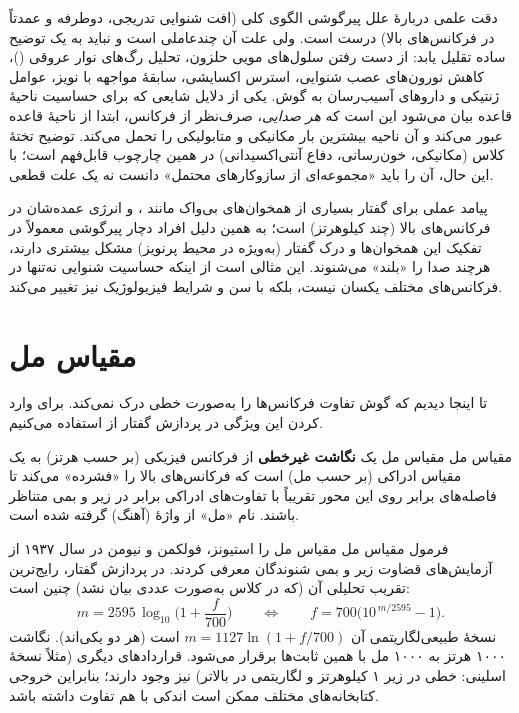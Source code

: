 \begin{correctionbox}{دقت علمی دربارهٔ علل پیرگوشی}
الگوی کلی (افت شنوایی تدریجی، دوطرفه و عمدتاً در فرکانس‌های بالا) درست است. ولی علت آن چندعاملی است و نباید به یک توضیح ساده تقلیل یابد: از دست رفتن سلول‌های مویی حلزون، تحلیل رگ‌های نوار عروقی ()، کاهش نورون‌های عصب شنوایی، استرس اکسایشی، سابقهٔ مواجهه با نویز، عوامل ژنتیکی و داروهای آسیب‌رسان به گوش. یکی از دلایل شایعی که برای حساسیت ناحیهٔ قاعده بیان می‌شود این است که \emph{هر صدایی}، صرف‌نظر از فرکانس، ابتدا از ناحیهٔ قاعده عبور می‌کند و آن ناحیه بیشترین بار مکانیکی و متابولیکی را تحمل می‌کند. توضیح تختهٔ کلاس (مکانیکی، خون‌رسانی، دفاع آنتی‌اکسیدانی) در همین چارچوب قابل‌فهم است؛ با این حال، آن را باید «مجموعه‌ای از سازوکارهای محتمل» دانست نه یک علت قطعی.
\end{correctionbox}

\begin{addedbox}{پیامد عملی برای گفتار}
بسیاری از همخوان‌های بی‌واک مانند ،  و  انرژی عمده‌شان در فرکانس‌های بالا (چند کیلوهرتز) است؛ به همین دلیل افراد دچار پیرگوشی معمولاً در تفکیک این همخوان‌ها و درک گفتار (به‌ویژه در محیط پرنویز) مشکل بیشتری دارند، هرچند صدا را «بلند» می‌شنوند. این مثالی است از اینکه حساسیت شنوایی نه‌تنها در فرکانس‌های مختلف یکسان نیست، بلکه با سن و شرایط فیزیولوژیک نیز تغییر می‌کند.
\end{addedbox}

\section{مقیاس مل}

تا اینجا دیدیم که گوش تفاوت فرکانس‌ها را به‌صورت خطی درک نمی‌کند. برای وارد کردن این ویژگی در پردازش گفتار از  استفاده می‌کنیم.

\begin{definitionbox}{مقیاس مل}
مقیاس مل یک \textbf{نگاشت غیرخطی} از فرکانس فیزیکی (بر حسب هرتز) به یک مقیاس ادراکی (بر حسب مل) است که فرکانس‌های بالا را «فشرده» می‌کند تا فاصله‌های برابر روی این محور تقریباً با تفاوت‌های ادراکی برابر در زیر و بمی متناظر باشند. نام «مل» از واژهٔ  (آهنگ) گرفته شده است.
\end{definitionbox}

\begin{correctionbox}{فرمول مقیاس مل}
مقیاس مل را استیونز، فولکمن و نیومن در سال ۱۹۳۷ از آزمایش‌های قضاوت زیر و بمی شنوندگان معرفی کردند. در پردازش گفتار، رایج‌ترین تقریب تحلیلی آن (که در کلاس به‌صورت عددی بیان نشد) چنین است:
\[
m = 2595\,\log_{10}\!\Big(1+\frac{f}{700}\Big)
\qquad\Longleftrightarrow\qquad
f = 700\big(10^{\,m/2595}-1\big).
\]
نسخهٔ طبیعی‌لگاریتمی آن $m=1127\ln(1+f/700)$ است (هر دو یکی‌اند). نگاشت ۱۰۰۰ هرتز به ۱۰۰۰ مل با همین ثابت‌ها برقرار می‌شود. قراردادهای دیگری (مثلاً نسخهٔ اسلینی: خطی در زیر ۱ کیلوهرتز و لگاریتمی در بالاتر) نیز وجود دارند؛ بنابراین خروجی کتابخانه‌های مختلف ممکن است اندکی با هم تفاوت داشته باشد.
\end{correctionbox}

